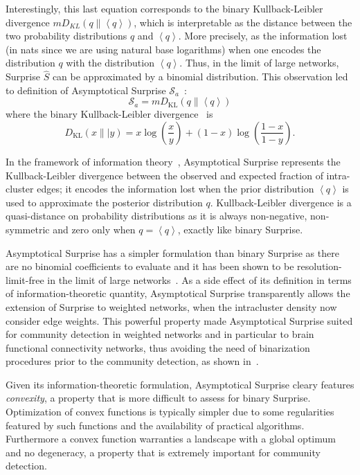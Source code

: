 Interestingly, this last equation corresponds to the binary Kullback-Leibler divergence $m D_{KL}(q \| \left< q \right>)$, which is interpretable as the distance between the two probability distributions $q$ and $\left<q\right>$.
More precisely, as the information lost (in nats since we are using natural base logarithms) when one encodes the distribution $q$ with the distribution $\left< q\right>$.
Thus, in the limit of large networks, Surprise $\hat{S}$ can be approximated by a binomial distribution.
This observation led to definition of Asymptotical Surprise $\mathcal{S}_a$~\cite{traag2015}:
\begin{equation}\label{eq:asymptoticalsurprise}
\mathcal{S}_a = m D_{\textrm{KL}}\left( q \| \left< q \right> \right)
\end{equation}
where the binary Kullback-Leibler divergence~\cite{kullback1951} is $$D_{\textrm{KL}}(x\|| y) = x \log \left(\frac{x}{y} \right) + (1-x)\log \left (\frac{1-x}{1-y} \right).$$

In the framework of information theory~\cite{cover2006}, Asymptotical Surprise represents the Kullback-Leibler divergence between the observed and expected fraction of intra-cluster edges; it encodes the information lost when the prior distribution $\left <q \right >$ is used to approximate the posterior distribution $q$. Kullback-Leibler divergence is a quasi-distance on probability distributions as it is always non-negative, non-symmetric and zero only when $q=\left< q \right>$, exactly like binary Surprise.

Asymptotical Surprise has a simpler formulation than binary Surprise as there are no binomial coefficients to evaluate and it has been shown to be resolution-limit-free in the limit of large networks~\cite{traag2015}. As a side effect of its definition in terms of information-theoretic quantity, Asymptotical Surprise transparently allows the extension of Surprise to weighted networks, when the intracluster density now consider edge weights.
This powerful property made Asymptotical Surprise suited for community detection in weighted networks and in particular to brain functional connectivity networks, thus avoiding the need of binarization procedures prior to the community detection, as shown in~\cite{nicolini2017}.

Given its information-theoretic formulation, Asymptotical Surprise cleary features \emph{convexity}, a property that is more difficult to assess for binary Surprise. Optimization of convex functions is typically simpler due to some regularities featured by such functions and the availability of practical algorithms. Furthermore a convex function warranties a landscape with a global optimum and no degeneracy, a property that is extremely important for community detection.

